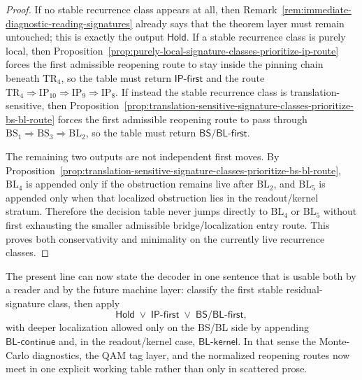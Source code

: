 \begin{proof}
If no stable recurrence class appears at all, then Remark~\ref{rem:immediate-diagnostic-reading-signatures} already says that the theorem layer must remain untouched; this is exactly the output \(\mathsf{Hold}\). If a stable recurrence class is purely local, then Proposition~\ref{prop:purely-local-signature-classes-prioritize-ip-route} forces the first admissible reopening route to stay inside the pinning chain beneath \(\mathrm{TR}_4\), so the table must return \(\mathsf{IP\text{-}first}\) and the route \(\mathrm{TR}_4 \Rightarrow \mathrm{IP}_{10} \Rightarrow \mathrm{IP}_9 \Rightarrow \mathrm{IP}_8\). If instead the stable recurrence class is translation-sensitive, then Proposition~\ref{prop:translation-sensitive-signature-classes-prioritize-bs-bl-route} forces the first admissible reopening route to pass through \(\mathrm{BS}_1 \Rightarrow \mathrm{BS}_3 \Rightarrow \mathrm{BL}_2\), so the table must return \(\mathsf{BS/BL\text{-}first}\).

The remaining two outputs are not independent first moves. By Proposition~\ref{prop:translation-sensitive-signature-classes-prioritize-bs-bl-route}, \(\mathrm{BL}_4\) is appended only if the obstruction remains live after \(\mathrm{BL}_2\), and \(\mathrm{BL}_5\) is appended only when that localized obstruction lies in the readout/kernel stratum. Therefore the decision table never jumps directly to \(\mathrm{BL}_4\) or \(\mathrm{BL}_5\) without first exhausting the smaller admissible bridge/localization entry route. This proves both conservativity and minimality on the currently live recurrence classes.
\end{proof}

\begin{remark}
\label{rem:immediate-operational-reading-of-the-decision-table}
The present line can now state the decoder in one sentence that is usable both by a reader and by the future machine layer: classify the first stable residual-signature class, then apply
\[
\mathsf{Hold}\;\vee\;\mathsf{IP\text{-}first}\;\vee\;\mathsf{BS/BL\text{-}first},
\]
with deeper localization allowed only on the BS/BL side by appending \(\mathsf{BL\text{-}continue}\) and, in the readout/kernel case, \(\mathsf{BL\text{-}kernel}\). In that sense the Monte-Carlo diagnostics, the QAM tag layer, and the normalized reopening routes now meet in one explicit working table rather than only in scattered prose.
\end{remark}


